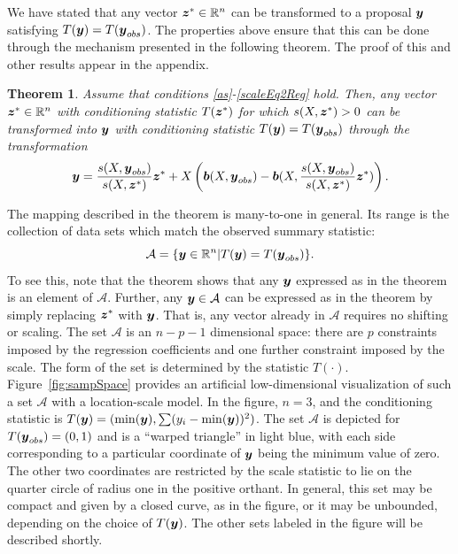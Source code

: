 \documentclass[11pt]{article}
\newcommand{\by}{\mbox{\boldmath $y$}}
\newcommand{\bz}{\mbox{\boldmath $z$}}
\newcommand{\bb}{\mbox{\boldmath $b$}}
\newcommand{\mc}{\mathcal}
\newtheorem{theorem}{Theorem}[section]
\newcommand{\green}[1]{{\color{green}#1}}
\begin{document}
We have stated that any vector $\bz^{*} \in \mathbb{R}^n$ can be transformed to a proposal
$\by$ satisfying $T(\by) = T(\by_{obs})$.  The properties above ensure
that this can be done through the mechanism presented in the following theorem.  The proof of this and other results appear in the appendix.
\begin{theorem}
\label{Transformation}
Assume that conditions \ref{as}-\ref{scaleEq2Reg} hold.  Then, any vector $\bz^* \in \mathbb{R}^n$ with conditioning statistic
$T(\bz^*)$ \green{for which $s(X,\bz^*) > 0$} can be transformed into $\by$ with conditioning statistic $T(\by) = T(\by_{obs})$ 
through the transformation 
\[
\by = \frac{s(X,\by_{obs})}{s(X,\bz^*)} \bz^* + X\left(\bb(X,\by_{obs}) - \bb(X,\frac{s(X,\by_{obs})}{s(X,\bz^*)} \bz^*)\right) .  
\]
\end{theorem}
The mapping described in the theorem is many-to-one in general.
Its range is the collection of data sets which match
the observed summary statistic:
\begin{equation}
\label{sampleSpace}
 \mathcal{A}=\{\by\in \mathbb{R}^n | T(\by)=T(\by_{obs})\}.
\end{equation}
To see this, note that the theorem shows that any $\by$ expressed as in the theorem is an element of $\mc A$. Further, any $\by \in \mc A$ can be expressed as in the theorem by simply replacing $\bz^{*}$ with $\by$. That is, any vector already in $\mc A$ requires no shifting or scaling. The set $\mathcal{A}$ is an $n - p - 1$ dimensional space: 
there are $p$ constraints imposed by the regression coefficients and one further constraint imposed by the scale.  
The form of the set is determined by the statistic $T(\cdot)$.  Figure~\ref{fig:sampSpace} 
provides an artificial low-dimensional
visualization of such a set $\mathcal{A}$ with a location-scale
  model.  In the figure, $n = 3$, and the conditioning
statistic is $T(\by)=(\min(\by), \sum (y_i - \min(\by))^2)$. The
set $\mathcal{A}$ is depicted  for $T(\by_{obs})=(0,1)$ and is a
``warped triangle'' in light blue, with each side
corresponding to a particular coordinate of $\by$ being the minimum
value \green{of} zero. The other two coordinates are restricted by the scale
statistic to lie on the quarter circle of radius one in the positive
orthant. In general, this set may be compact and given by a closed
curve, as in the figure, or it may be unbounded, depending on the
  choice of $T(\by)$.  The other sets labeled in the figure will be described shortly.
\end{document}
